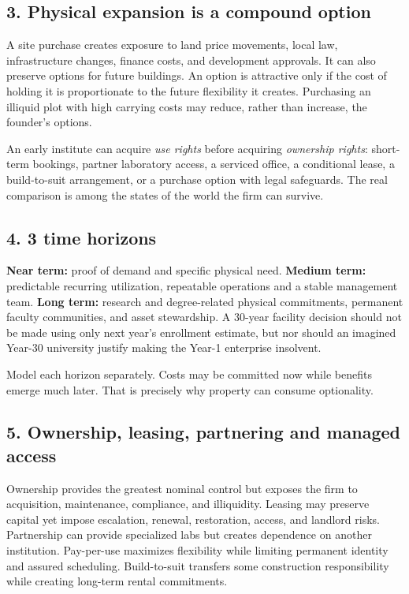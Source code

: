 \subsection{3. Physical expansion is a compound option}

A site purchase creates exposure to land price movements, local law, infrastructure changes, finance costs, and development approvals. It can also preserve options for future buildings. An option is attractive only if the cost of holding it is proportionate to the future flexibility it creates. Purchasing an illiquid plot with high carrying costs may reduce, rather than increase, the founder's options.

An early institute can acquire \textit{use rights} before acquiring \textit{ownership rights}: short-term bookings, partner laboratory access, a serviced office, a conditional lease, a build-to-suit arrangement, or a purchase option with legal safeguards. The real comparison is among the states of the world the firm can survive.


\subsection{4. 3 time horizons}

\textbf{Near term:} proof of demand and specific physical need. \textbf{Medium term:} predictable recurring utilization, repeatable operations and a stable management team. \textbf{Long term:} research and degree-related physical commitments, permanent faculty communities, and asset stewardship. A 30-year facility decision should not be made using only next year's enrollment estimate, but nor should an imagined Year-30 university justify making the Year-1 enterprise insolvent.

Model each horizon separately. Costs may be committed now while benefits emerge much later. That is precisely why property can consume optionality.


\subsection{5. Ownership, leasing, partnering and managed access}

Ownership provides the greatest nominal control but exposes the firm to acquisition, maintenance, compliance, and illiquidity. Leasing may preserve capital yet impose escalation, renewal, restoration, access, and landlord risks. Partnership can provide specialized labs but creates dependence on another institution. Pay-per-use maximizes flexibility while limiting permanent identity and assured scheduling. Build-to-suit transfers some construction responsibility while creating long-term rental commitments.

